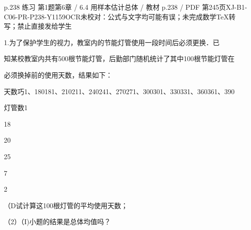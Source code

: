 \begin{bankitem}{p.238 练习 第1题}{第6章 / 6.4 用样本估计总体 / 教材 p.238 / PDF 第245页}{XJ-B1-C06-PR-P238-Y1159}{OCR未校对：公式与文字均可能有误；未完成数学TeX转写；禁止直接发给学生}
\begin{ocrdraft}
\par
1.为了保护学生的视力，教室内的节能灯管使用一段时间后必须更换．已
\par
知某校教室内共有500根节能灯管，后勤部门随机统计了其中100根节能灯管在
\par
必须换掉前的使用天数，结果如下：
\par
天数巧1、180181、210211、240241、270271、300301、330331、360361、390
\par
灯管数1
\par
18
\par
20
\par
25
\par
7
\par
2
\par
（D试计算这100根灯管的平均使用天数；
\par
（2）（I)小题的结果是总体均值吗？
\end{ocrdraft}
\end{bankitem}
